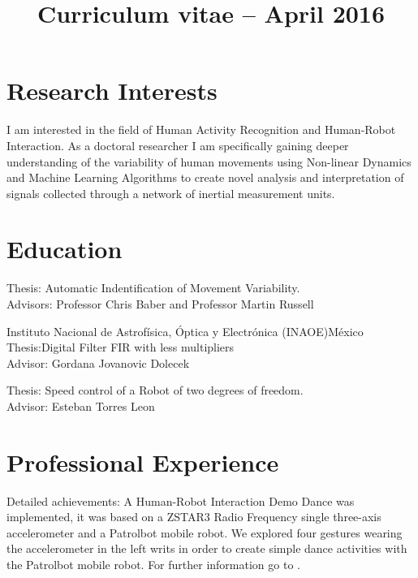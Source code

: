 \documentclass[10pt,a4paper,roman]{moderncv}
\title{Curriculum vitae -- April 2016}    %
\begin{document}
\makecvtitle

\section{Research Interests} 
I am interested in the field of Human Activity Recognition and Human-Robot Interaction. 
As a doctoral researcher I am specifically gaining deeper understanding of the variability 
of human movements using Non-linear Dynamics and Machine Learning Algorithms
to create novel analysis and interpretation of signals collected through a network of inertial measurement units.


\section{Education}

  {Thesis: Automatic Indentification of Movement Variability.
   \\ Advisors: Professor Chris Baber and  Professor Martin Russell  } 
 
  {Instituto Nacional de Astrof\'isica, \'Optica y Electr\'onica (INAOE)}{M\'exico}{} 
  {Thesis:Digital Filter FIR with less multipliers
  \href{https://sites.google.com/site/perezxochicale/docs/MScThesis.pdf}{\faFilePdfO}
  \\ Advisor: Gordana Jovanovic Dolecek}

  {Thesis: Speed control of a Robot of two degrees of freedom.
  \href{https://sites.google.com/site/perezxochicale/docs/BachelorProject.pdf}{\faFilePdfO}
  \\ Advisor: Esteban Torres Leon}


\section{Professional Experience}

{Detailed achievements: A Human-Robot Interaction Demo Dance was implemented, it was based on a 
ZSTAR3 Radio Frequency single three-axis accelerometer and a Patrolbot mobile robot. 
We explored four gestures wearing the accelerometer in the left writs 
in order to create simple dance activities with the Patrolbot mobile robot.
For further information go to \href{https://sites.google.com/site/perezxochicale/projects/demodance}{\faExternalLink}.}
\end{document}
